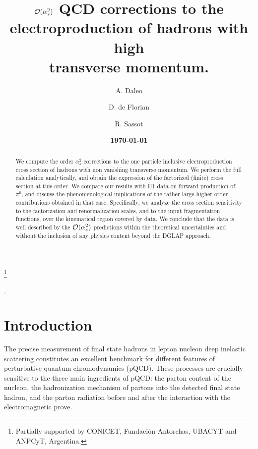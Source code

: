 \documentclass[superscriptaddress,showkeys,showpacs]{revtex4}
\begin{document}
\title{ ${\cal{O}}(\alpha_s^2)$ QCD corrections to the electroproduction of hadrons with high\\ transverse momentum.}
\thanks{Partially supported by CONICET, Fundaci\'on Antorchas, UBACYT and 
ANPCyT, Argentina.}
\author{A. Daleo}
.
\author{D. de Florian} 
\author{R. Sassot}
\date{{\bf \today}}

\begin{abstract}
We compute the order $\alpha_s^2$ corrections to the one particle inclusive
electroproduction cross section of hadrons with non vanishing transverse 
momentum. We perform the full calculation analytically, 
and obtain the
expression of the factorized (finite) cross section at this order. 
We compare our results with  H1 data on forward production of 
$\pi^0$, and discuss the phenomenological implications of the rather large 
higher order contributions obtained in that case. Specifically, we analyze the 
cross section sensitivity to the factorization and renormalization scales, 
and to the input fragmentation functions, over the kinematical region 
covered by data. We conclude that the data is well described by the  
${\cal{O}}(\alpha_s^2)$ predictions within the theoretical uncertainties and without the inclusion of any physics content beyond the DGLAP approach.
\end{abstract}


\maketitle

\section*{Introduction}
The precise measurement of final state hadrons in lepton nucleon deep 
inelastic scattering constitutes an excellent benchmark for different 
features of perturbative quantum chromodynamics (pQCD). These processes 
are crucially sensitive to 
the three main ingredients of pQCD: the parton content of the nucleon,
the hadronization mechanism of partons into the detected final state hadron, 
and the parton radiation before and after the interaction with the 
electromagnetic prove.
\end{document}
